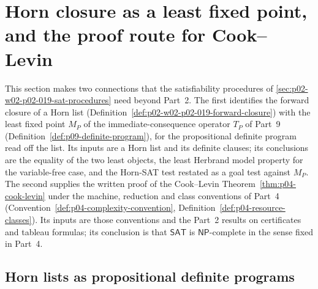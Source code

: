 \section{Horn closure as a least fixed point, and the proof route for Cook--Levin}
\label{sec:p02-w02b-p02-015-links}

This section makes two connections that the satisfiability procedures of
\cref{sec:p02-w02-p02-019-sat-procedures} need beyond Part~2.  The first
identifies the forward closure of a Horn list
(Definition~\ref{def:p02-w02-p02-019-forward-closure}) with the least fixed
point \(M_P\) of the immediate-consequence operator \(T_P\) of Part~9
(Definition~\ref{def:p09-definite-program}), for the propositional definite
program read off the list.  Its inputs are a Horn list and its definite
clauses; its conclusions are the equality of the two least objects, the least
Herbrand model property for the variable-free case, and the Horn-SAT test
restated as a goal test against \(M_P\).  The second supplies the written
proof of the Cook--Levin Theorem~\ref{thm:p04-cook-levin} under the machine,
reduction and class conventions of Part~4
(Convention~\ref{def:p04-complexity-convention},
Definition~\ref{def:p04-resource-classes}).  Its inputs are those conventions
and the Part~2 results on certificates and tableau formulas; its conclusion is
that \(\mathsf{SAT}\) is \(\mathsf{NP}\)-complete in the sense fixed in
Part~4.

\subsection{Horn lists as propositional definite programs}
\label{sec:p02-w02b-p02-015-horn-programs}

